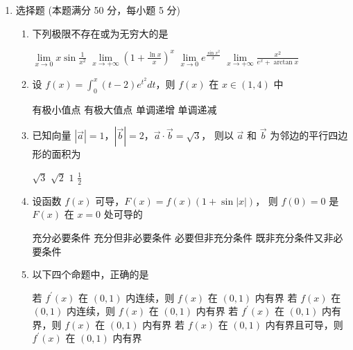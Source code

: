 
\begin{enumerate}
	\item
选择题 (本题满分 50 分，每小题 5 分)
\begin{enumerate}
	\item
下列极限不存在或为无穷大的是 

\fourchoices
{$\lim\limits_{x \rightarrow 0} x \sin \frac{1}{x^2}$}
{$\lim\limits_{x \rightarrow+\infty}\left(1+\frac{\ln x}{x}\right)^x$}
{$\lim\limits_{x \rightarrow 0} e^{\frac{\sin x^2}{x}}$}
{$\lim\limits_{x \rightarrow+\infty} \frac{x^2}{e^x+\arctan x}$}


\item
设 $f(x)=\int_0^x(t-2) e^{t^2} d t$，则 $f(x)$ 在 $x \in(1,4)$ 中 

\fourchoices
{有极小值点}
{有极大值点}
{单调递增}
{单调递减}


\item
已知向量 $|\vec{a}|=1$，$|\vec{b}|=2$，$\vec{a} \cdot \vec{b}=\sqrt{3}$，
则以 $\vec{a}$ 和 $\vec{b}$ 为邻边的平行四边形的面积为 

\fourchoices
{$\sqrt{3}$}
{$\sqrt{2}$}
{$1$}
{$\frac{1}{2}$}


\item
设函数 $f(x)$ 可导，$F(x)=f(x)(1+\sin |x|)$，
则 $f(0)=0$ 是 $F(x)$ 在 $x=0$ 处可导的 

\fourchoices
{充分必要条件}
{充分但非必要条件}
{必要但非充分条件}
{既非充分条件又非必要条件}


\item
以下四个命题中，正确的是 

\fourchoices
{若 $f^{\prime}(x)$ 在 $(0,1)$ 内连续，则 $f(x)$ 在 $(0,1)$ 内有界}
{若 $f(x)$ 在 $(0,1)$ 内连续，则 $f(x)$ 在 $(0,1)$ 内有界}
{若 $f^{\prime}(x)$ 在 $(0,1)$ 内有界，则 $f(x)$ 在 $(0,1)$ 内有界}
{若 $f(x)$ 在 $(0,1)$ 内有界且可导，则 $f^{\prime}(x)$ 在 $(0,1)$ 内有界}



\end{enumerate}
\end{enumerate}

